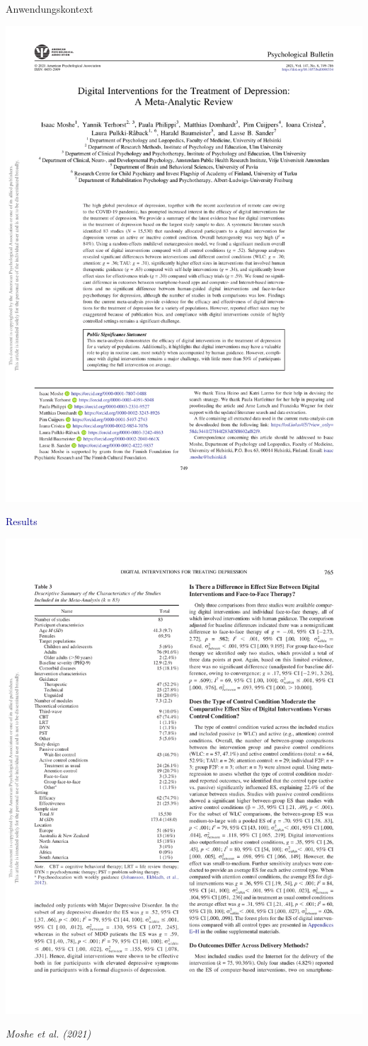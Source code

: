 \documentclass[
  8pt,
  ignorenonframetext,
]{beamer}
\begin{document}
\begin{frame}[t]{Anwendungskontext}
\protect\hypertarget{anwendungskontext-4}{}
\begin{center}\includegraphics[width=0.7\linewidth]{8_Abbildungen/alm_8_review_title} \end{center}
\center

\textcolor{darkblue}{Results}

\begin{center}\includegraphics[width=0.5\linewidth]{8_Abbildungen/alm_8_review_results} \end{center}
\flushright
\footnotesize

\emph{Moshe et al. (2021)}
\end{frame}
\end{document}
